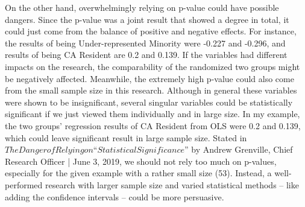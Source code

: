 \documentclass[letterpaper, 12 pt, conference]{article}
\begin{document}
\begin{enumerate}
    On the other hand, overwhelmingly relying on p-value could have possible dangers. Since the p-value was a joint result that showed a degree in total, it could just come from the balance of positive and negative effects. For instance, the results of being Under-represented Minority were -0.227 and -0.296, and results of being CA Resident are 0.2 and 0.139. If the variables had different impacts on the research, the comparability of the randomized two groups might be negatively affected. Meanwhile, the extremely high p-value could also come from the small sample size in this research. Although in general these variables were shown to be insignificant, several singular variables could be statistically significant if we just viewed them individually and in large size. In my example, the two groups’ regression results of CA Resident from OLS were 0.2 and 0.139, which could leave significant result in large sample size. Stated in $The Danger of Relying on “Statistical Significance”$  by Andrew Grenville, Chief Research Officer | June 3, 2019, we should not rely too much on p-values, especially for the given example with a rather small size (53). Instead, a well-performed research with larger sample size and varied statistical methods -- like adding the confidence intervals -- could be more persuasive.


\end{enumerate}
\end{document}

